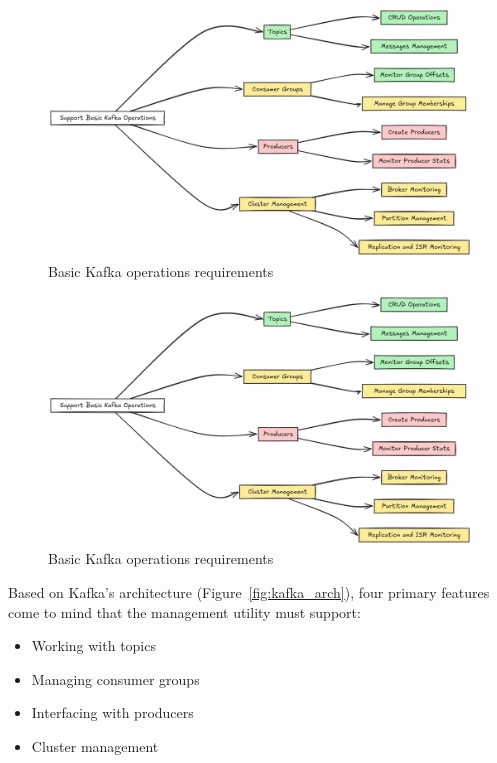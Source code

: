 \documentclass[10pt , a4paper]{report}
\begin{document}
\begin{figure}[htbp]
    \centering
    \includegraphics[width=1\linewidth]{imgs/BasicKafkaOperationsDiagram.png}
    \caption{Basic Kafka operations requirements}
    \label{fig:basic_kafka_operations}
\end{figure}

\begin{figure}[htbp]
    \centering
    \includegraphics[width=1\linewidth]{imgs/BasicKafkaOperationsDiagram.png}
    \caption{Basic Kafka operations requirements}
    \label{fig:basic_kafka_operations}
\end{figure}

Based on Kafka's architecture (Figure~\ref{fig:kafka_arch}), four primary features come to mind that the management utility must support:
\begin{itemize}
    \item Working with topics
    \item Managing consumer groups
    \item Interfacing with producers
    \item Cluster management
\end{itemize}
\end{document}
